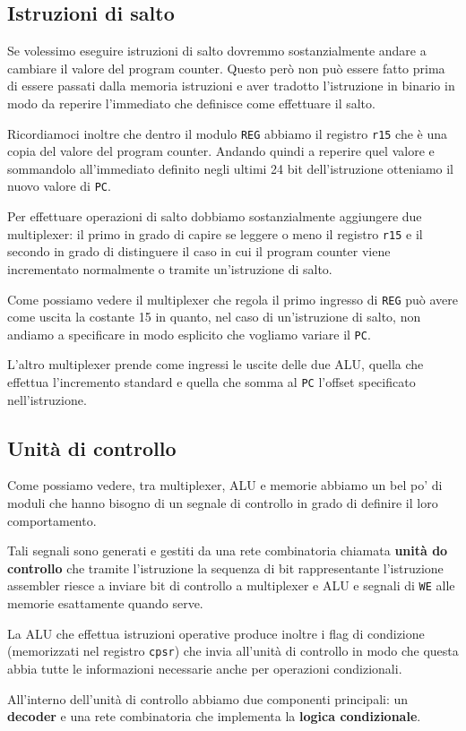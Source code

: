 \subsection{Istruzioni di salto}
Se volessimo eseguire istruzioni di salto dovremmo sostanzialmente andare a cambiare il valore del
program counter. Questo però non può essere fatto prima di essere passati dalla memoria istruzioni
e aver tradotto l'istruzione in binario in modo da reperire l'immediato che definisce come
effettuare il salto.

Ricordiamoci inoltre che dentro il modulo \verb|REG| abbiamo il registro \verb|r15| che è una copia
del valore del program counter. Andando quindi a reperire quel valore e sommandolo all'immediato
definito negli ultimi 24 bit dell'istruzione otteniamo il nuovo valore di \verb|PC|.

Per effettuare operazioni di salto dobbiamo sostanzialmente aggiungere due multiplexer: il primo in
grado di capire se leggere o meno il registro \verb|r15| e il secondo in grado di distinguere il
caso in cui il program counter viene incrementato normalmente o tramite un'istruzione di salto.
\begin{center}
	
\end{center}
Come possiamo vedere il multiplexer che regola il primo ingresso di \verb|REG| può avere come
uscita la costante 15 in quanto, nel caso di un'istruzione di salto, non andiamo a specificare in
modo esplicito che vogliamo variare il \verb|PC|.

L'altro multiplexer prende come ingressi le uscite delle due ALU, quella che effettua l'incremento
standard e quella che somma al \verb|PC| l'offset specificato nell'istruzione.

\subsection{Unità di controllo}
Come possiamo vedere, tra multiplexer, ALU e memorie abbiamo un bel po' di moduli che hanno bisogno
di un segnale di controllo in grado di definire il loro comportamento.

Tali segnali sono generati e gestiti da una rete combinatoria chiamata \textbf{unità do controllo}
che tramite l'istruzione la sequenza di bit rappresentante l'istruzione assembler riesce a inviare
bit di controllo a multiplexer e ALU e segnali di \verb|WE| alle memorie esattamente quando serve.

La ALU che effettua istruzioni operative produce inoltre i flag di condizione (memorizzati nel
registro \verb|cpsr|) che invia all'unità di controllo in modo che questa abbia tutte le
informazioni necessarie anche per operazioni condizionali.
\begin{center}
	
\end{center}
All'interno dell'unità di controllo abbiamo due componenti principali: un \textbf{decoder} e una
rete combinatoria che implementa la \textbf{logica condizionale}.

